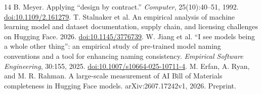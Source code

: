 \documentclass[10pt,twocolumn,letterpaper]{article}
\begin{document}
\begin{thebibliography}{14}
 B. Meyer. Applying ``design by contract.'' \emph{Computer}, 25(10):40--51, 1992. \href{https://doi.org/10.1109/2.161279}{doi:10.1109/2.161279}.
 T. Stalnaker et al. An empirical analysis of machine learning model and dataset documentation, supply chain, and licensing challenges on Hugging Face. 2026. \href{https://doi.org/10.1145/3776739}{doi:10.1145/3776739}.
 W. Jiang et al. ``I see models being a whole other thing'': an empirical study of pre-trained model naming conventions and a tool for enhancing naming consistency. \emph{Empirical Software Engineering}, 30:155, 2025. \href{https://doi.org/10.1007/s10664-025-10711-4}{doi:10.1007/s10664-025-10711-4}.
 M. Erfan, A. Ryan, and M. R. Rahman. A large-scale measurement of AI Bill of Materials completeness in Hugging Face models. arXiv:2607.17242v1, 2026. Preprint.
\end{thebibliography}
\end{document}
